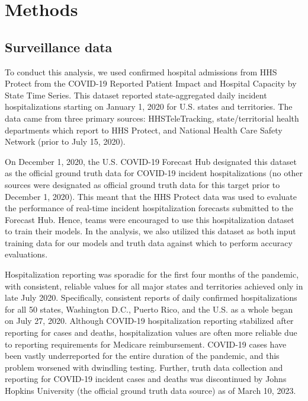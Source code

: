 \documentclass[thesis]{umassthesis}  %
\begin{document}
\chapter{Methods} \label{methods}
\section{Surveillance data} \label{surveillance_data}
To conduct this analysis, we used confirmed hospital admissions from HHS Protect from the COVID-19 Reported Patient Impact and Hospital Capacity by State Time Series. This dataset reported state-aggregated daily incident hospitalizations starting on January 1, 2020 for U.S. states and territories. The data came from three primary sources: HHSTeleTracking, state/territorial health departments which report to HHS Protect, and National Health Care Safety Network (prior to July 15, 2020)\cite{hhs_data}.

On December 1, 2020, the U.S. COVID-19 Forecast Hub designated this dataset as the official ground truth data for COVID-19 incident hospitalizations (no other sources were designated as official ground truth data for this target prior to December 1, 2020)\cite{hub_data_repo}. This meant that the HHS Protect data was used to evaluate the performance of real-time incident hospitalization forecasts submitted to the Forecast Hub. Hence, teams were encouraged to use this hospitalization dataset to train their models\cite{cramer}. In the analysis, we also utilized this dataset as both input training data for our models and truth data against which to perform accuracy evaluations.

Hospitalization reporting was sporadic for the first four months of the pandemic, with consistent, reliable values for all major states and territories achieved only in late July 2020. Specifically, consistent reports of daily confirmed hospitalizations for all 50 states, Washington D.C., Puerto Rico, and the U.S. as a whole began on July 27, 2020. Although COVID-19 hospitalization reporting stabilized after reporting for cases and deaths, hospitalization values are often more reliable due to reporting requirements for Medicare reimbursement. COVID-19 cases have been vastly underreported for the entire duration of the pandemic\cite{mech_bayes}, and this problem worsened with dwindling testing. Further, truth data collection and reporting for COVID-19 incident cases and deaths was discontinued by Johns Hopkins University (the official ground truth data source) as of March 10, 2023\cite{jhu_covid}.
\end{document}
